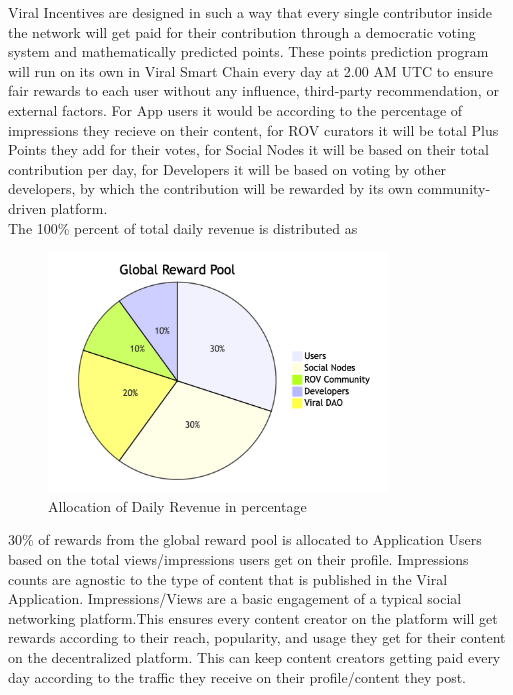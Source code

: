 \documentclass[10pt]{article}
\begin{document}
Viral Incentives are designed in such a way that every single contributor inside the network will get paid for their contribution through a democratic voting system and mathematically predicted points. These points prediction program will run on its own in Viral Smart Chain every day at 2.00 AM UTC to ensure fair rewards to each user without any influence, third-party recommendation, or external factors. For App users it would be according to the percentage of impressions they recieve on their content, for ROV curators it will be total Plus Points they add for their votes, for Social Nodes it will be based on their total contribution per day, for Developers it will be based on voting by other developers, by which the contribution will be rewarded by its own community-driven platform.\\

The 100\% percent of total daily revenue is distributed as \\
\begin{figure}[H]
\begin{center}
\includegraphics[width=9cm]{rewards}
\caption{Allocation of Daily Revenue in percentage}
\end{center}
\end{figure}

30\% of rewards from the global reward pool is allocated to Application Users based on the total views/impressions users get on their profile. Impressions counts are agnostic to the type of content that is published in the Viral Application. Impressions/Views are a basic engagement of a typical social networking platform.This ensures every content creator on the platform will get rewards according to their reach, popularity, and usage they get for their content on the decentralized platform. This can keep content creators getting paid every day according to the traffic they receive on their profile/content they post.\\
\end{document}
